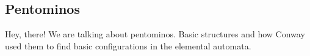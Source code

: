 
\subsection{Pentominos}
Hey, there! We are talking about pentominos. Basic structures and how
Conway used them to find basic configurations in the elemental automata.
